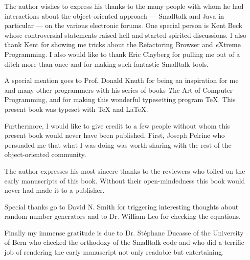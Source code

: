 %
The author wishes to express his
thanks to the many people with whom he had interactions about the
object-oriented approach --- Smalltalk and Java in particular ---
on the various electronic forums. One special person is Kent Beck
whose controversial statements raised hell and started spirited
discussions. I also thank Kent for showing me tricks about the
Refactoring Browser and {\textsl eXtreme Programming}. I also would
like to thank Eric Clayberg for pulling me out of a ditch more
than once and for making such fantastic Smalltalk tools.

A special mention goes to Prof. Donald Knuth for being an
inspiration for me and many other programmers with his series of
books {\textsl The Art of Computer Programming}, and for making this
wonderful typesetting program \TeX. This present book was typeset
with \TeX{} and \LaTeX.

Furthermore, I would like to give credit to a few people without
whom this present book would never have been published. First,
Joseph Pelrine who persuaded me that what I was doing was worth
sharing with the rest of the object-oriented community.

The author expresses his most sincere thanks to the reviewers who
toiled on the early manuscripts of this book. Without their
open-mindedness this book would never had made it to a publisher.

Special thanks go to David N. Smith for triggering interesting
thoughts about random number generators and to Dr. William Leo for
checking the equations.

Finally my immense gratitude is due to Dr. St\'ephane Ducasse of the
University of Bern who checked the orthodoxy of the Smalltalk code
and who did a terrific job of rendering the early manuscript not
only readable but entertaining.

\bigskip
{}


